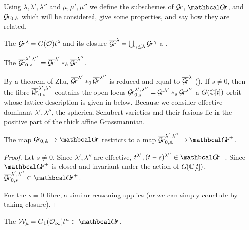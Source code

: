 \documentclass{article}
\begin{document}
Using $\lambda,\lambda',\lambda''$ and $\mu,\mu',\mu''$ we define the subschemes of $\mathcal{G}\!r$, $\Grth$, and ${\mathcal{G}\!r_{0,\mathbb A}}$ which will be considered, give some properties, and say how they are related.  
% 
\begin{definition}\label{def:sphschub}
    The  $\mathcal{G}\!r^\lambda = G(\mathcal O) t^\lambda$ and its closure 
    $ \overline{\mathcal{G}\!r}^\lambda = \bigcup_{\gamma \le \lambda} \mathcal{G}\!r^{\gamma} $ 
    a .  
\end{definition}
% 
\begin{definition}\label{def:sphfus}
    The  $\overline{\mathcal{G}\!r}^{\lambda', \lambda''}_{0, \mathbb A} = \overline{\mathcal{G}\!r}^{\lambda'} \ast_{\mathbb A} \overline{\mathcal{G}\!r}^{\lambda''} $.
\end{definition}
% 
By a theorem of Zhu, $ \overline{\mathcal{G}\!r}^{\lambda'} \ast_{0} \overline{\mathcal{G}\!r}^{\lambda''} $ is reduced and equal to $ \overline{\mathcal{G}\!r}^{\lambda}$ (\cite[Proposition 3.1.14]{zhu2016introduction}).
If $s\ne0$, then the fibre $\overline{\mathcal{G}\!r}_{0,s}^{\lambda', \lambda''}$ contains the open locus $ \mathcal{G}\!r_{0,s}^{\lambda', \lambda''} =  \mathcal{G}\!r^{\lambda'} \ast_{s} \mathcal{G}\!r^{\lambda''} $ a $ G(\mathbb C[t])$-orbit whose lattice description is given in  below.
% 
Because we consider effective dominant $\lambda',\lambda''$, the spherical Schubert varieties and their fusions lie in the positive part of the thick affine Grassmannian.
% 
\begin{lemma}\label{le:sphfusispos}
    The map $ \Gr_{0, \AA} \rightarrow \Grth$ restricts to a map $ \overline{\Gr}^{\lambda', \lambda''}_{0, \AA} \rightarrow \Grth^+$.
\end{lemma}
% 
\begin{proof}
    Let $ s \ne 0 $. Since $ \lambda', \lambda'' $ are effective, $ t^{\lambda'}, (t-s)^{\lambda''} \in \Grth^+ $.  Since $\Grth^+$ is closed and invariant under the action of $ G(\mathbb C[t])$,  $ \overline{\Gr}_{0,s}^{\lambda', \lambda''} \subset \Grth^+$.
    
    For the $ s = 0$ fibre, a similar reasoning applies (or we can simply conclude by taking closure).
\end{proof}
% 
\begin{definition}\label{def:klslice}
    The  $\cW_\mu = G_1(\Oinf) t^\mu \subset \Grth $.
\end{definition}
% 
\end{document}
